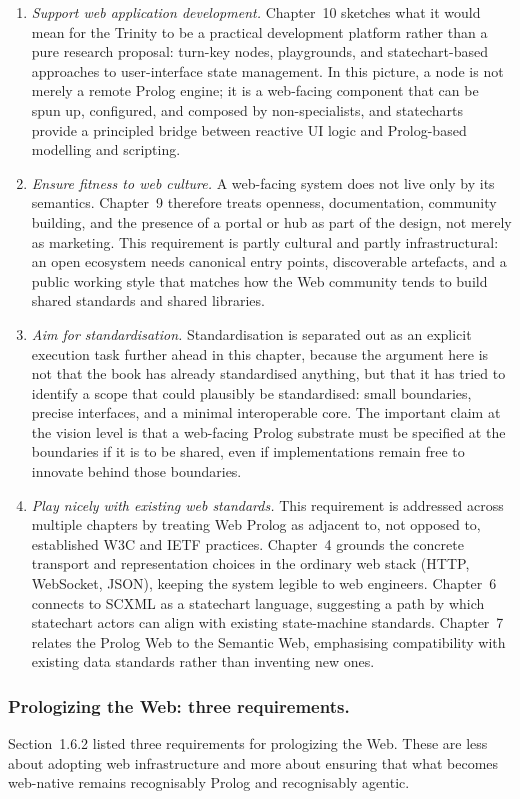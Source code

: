 \begin{enumerate}
\item \emph{Support web application development.} Chapter~10 sketches what it would mean for the Trinity to be a practical development platform rather than a pure research proposal: turn-key nodes, playgrounds, and statechart-based approaches to user-interface state management. In this picture, a node is not merely a remote Prolog engine; it is a web-facing component that can be spun up, configured, and composed by non-specialists, and statecharts provide a principled bridge between reactive UI logic and Prolog-based modelling and scripting.
\item \emph{Ensure fitness to web culture.} A web-facing system does not live only by its semantics. Chapter~9 therefore treats openness, documentation, community building, and the presence of a portal or hub as part of the design, not merely as marketing. This requirement is partly cultural and partly infrastructural: an open ecosystem needs canonical entry points, discoverable artefacts, and a public working style that matches how the Web community tends to build shared standards and shared libraries.
\item \emph{Aim for standardisation.} Standardisation is separated out as an explicit execution task further ahead in this chapter, because the argument here is not that the book has already standardised anything, but that it has tried to identify a scope that could plausibly be standardised: small boundaries, precise interfaces, and a minimal interoperable core. The important claim at the vision level is that a web-facing Prolog substrate must be specified at the boundaries if it is to be shared, even if implementations remain free to innovate behind those boundaries.
\item \emph{Play nicely with existing web standards.} This requirement is addressed across multiple chapters by treating Web Prolog as adjacent to, not opposed to, established W3C and IETF practices. Chapter~4 grounds the concrete transport and representation choices in the ordinary web stack (HTTP, WebSocket, JSON), keeping the system legible to web engineers. Chapter~6 connects to SCXML as a statechart language, suggesting a path by which statechart actors can align with existing state-machine standards. Chapter~7 relates the Prolog Web to the Semantic Web, emphasising compatibility with existing data standards rather than inventing new ones.  
\end{enumerate}

\subsubsection{Prologizing the Web: three requirements.}
Section~1.6.2 listed three requirements for prologizing the Web. These are less about adopting web infrastructure and more about ensuring that what becomes web-native remains recognisably Prolog and recognisably agentic.

